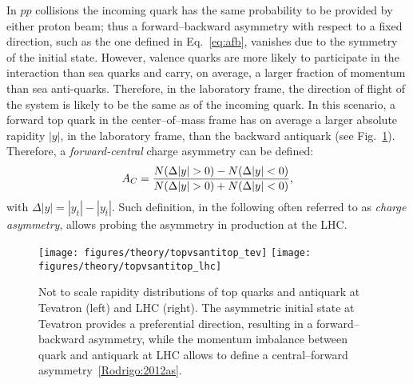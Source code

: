 In $pp$ collisions the incoming quark has the same probability to be provided by
either proton beam; thus a forward--backward asymmetry with respect to
a fixed direction, such as the one defined in Eq.~\ref{eq:afb},
vanishes due to the symmetry of the initial state. However, valence
quarks are more likely to participate in the interaction than sea
quarks and carry, on average, a larger fraction of momentum than sea
anti-quarks. Therefore, in the laboratory frame, the direction of
flight of the \ttbar{} system is likely to be the same as of the
incoming quark. In this scenario, a forward top quark in the \ttbar{}
center--of--mass frame has on average a larger absolute rapidity
$|y|$, in the laboratory frame, than the backward antiquark (see
Fig.~\ref{fig:rapidities}).
Therefore, a {\it forward-central} charge asymmetry \ac{} can be defined:
\begin{equation}
\label{eq:ac}
\ac{}=\frac{N(\Delta{}|y|>0)-N(\Delta{}|y|<0)}{N(\Delta{}|y|>0)+N(\Delta{}|y|<0)},
\end{equation}
with $\Delta{}|y|=|y_t| - |y_{\bar{t}}|$.
Such definition, in the following often referred to as {\it charge
  asymmetry}, allows probing the asymmetry in \ttbar{} production at
the LHC. 

\begin{figure}[!htb]
  \centering
  \texttt{[image: figures/theory/topvsantitop\_tev]} 
  \texttt{[image: figures/theory/topvsantitop\_lhc]} 
  \caption{Not to scale rapidity distributions of top
    quarks and antiquark at Tevatron (left) and LHC (right). The
    asymmetric initial state at Tevatron provides a preferential
    direction, resulting in a forward--backward asymmetry, while the
    momentum imbalance between quark and antiquark at LHC allows to
    define a central--forward asymmetry~\ref{Rodrigo:2012as}.} 
  \label{fig:rapidities}
\end{figure}

